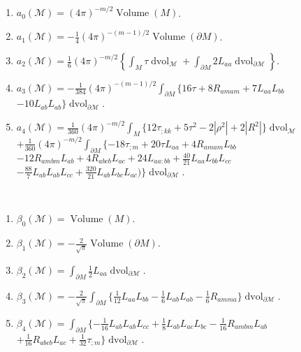 \documentclass{amsart}
\begin{document}
\begin{theorem}\ \label{thm-1.1}
\begin{enumerate}
\item $a_0(\mathcal{M})=(4\pi)^{-m/2}\operatorname{Volume}(M)$.
\smallbreak\item 
$a_1(\mathcal{M})=-\frac14(4\pi)^{-(m-1)/2}\operatorname{Volume}(\partial M)$. 
\smallbreak\item $a_2(\mathcal{M})=\frac16(4\pi)^{-m/2}\left\{\int_M\tau 
\operatorname{dvol}_{\mathcal{M}}
+\int_{\partial M}2L_{aa}\operatorname{dvol}_{\partial\mathcal{M}}\right\}$.
\smallbreak\item $a_3(\mathcal{M})=-\frac1{384}(4\pi)^{-(m-1)/2}
\int_{\partial M}\{16\tau+8R_{amam}
+7L_{aa}L_{bb}$\smallbreak$-10L_{ab}L_{ab}\}\operatorname{dvol}_{\partial\mathcal{M}}$.
\smallbreak\item
$a_4(\mathcal{M})=\frac1{360}(4\pi)^{-m/2}\int_M\{12\tau_{;kk}+5\tau^{2}-2|\rho^{2}|+2|R^{2}|\}
\operatorname{dvol}_{\mathcal{M}}$
\smallbreak
$+\frac1{360}(4\pi)^{-m/2}\int_{\partial M}\{-18\tau_{;m}+20\tau L_{aa}
+4R_{am
am}L_{bb}$\smallbreak$ -12R_{am bm}L_{ab}+4R_{ab
cb}L_{ac}+24L_{aa:bb}+\frac{40}{21}L_{aa}L_{bb}L_{cc}$\smallbreak$
-\frac{88}7L_{ab}L_{ab}L_{cc}+\frac{320}{21}L_{ab}L_{bc}L_{ac})\}\operatorname{dvol}_{\partial\mathcal{M}}$.
\end{enumerate}
\end{theorem}
\begin{theorem}\ \label{thm-1.2}
\begin{enumerate}
\smallbreak\item $\beta_0(\mathcal{M})=\operatorname{Volume}(M)$.
\smallbreak\item $\beta_1(\mathcal{M})=
 -\frac2{\sqrt\pi}\operatorname{Volume}(\partial M)$.
\smallskip\item $\beta_2(\mathcal{M})={\int}_{\partial M}\frac12
 L_{aa}\operatorname{dvol}_{\partial\mathcal{M}}$.
\smallbreak\item $\beta_3(\mathcal{M})=
 -\frac2{\sqrt\pi}{\int}_{\partial M}\{\frac1{12} L_{aa}L_{bb}
 -\frac16 L_{ab}L_{ab}-\frac16 R_{amma}\}\operatorname{dvol}_{\partial\mathcal{M}}$.
\smallbreak\item $\beta_4(\mathcal{M})={\int}_{{\partial M}}\{- \frac1{16} L_{
ab}L_{ab}L_{cc}+\frac18 L_{ab}L_{ac}L_{bc}-\frac1{16} R_{am bm}L_{
ab}$\smallbreak$
+\frac1{16} R_{ab cb}L_{ac}+\frac1{32}\tau_{;m}\}\operatorname{dvol}_{\partial\mathcal{M}}$.
\end{enumerate}\end{theorem}
\end{document}
